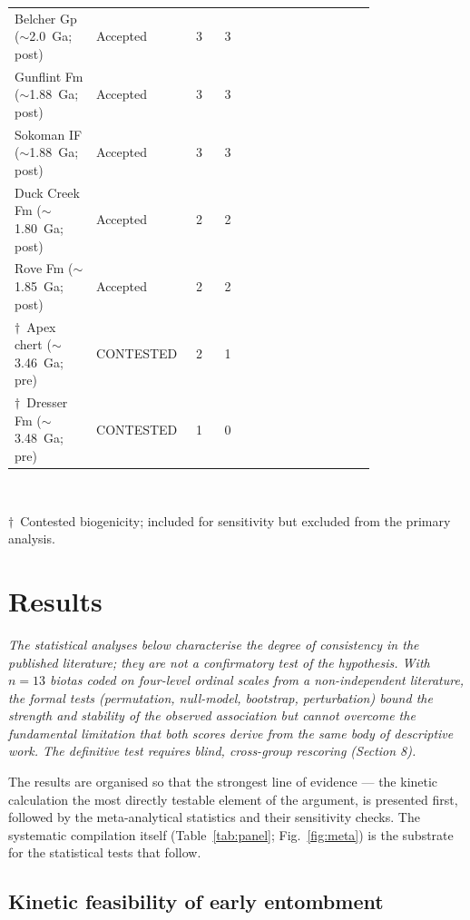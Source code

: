 \documentclass[11pt]{article}
\begin{document}
\begin{table}[t]
\begin{tabular}{p{0.205\linewidth}p{0.135\linewidth}p{0.075\linewidth}p{0.075\linewidth}p{0.30\linewidth}}
\midrule
Belcher Gp ($\sim$2.0~Ga; post) & Accepted & 3 & 3 & \citep{Javaux2018} \\
Gunflint Fm ($\sim$1.88~Ga; post) & Accepted & 3 & 3 & \citep{Lepot2017a,Wacey2013,Alleon2016a} \\
Sokoman IF ($\sim$1.88~Ga; post) & Accepted & 3 & 3 & \citep{Javaux2018} \\
Duck Creek Fm ($\sim$1.80~Ga; post) & Accepted & 2 & 2 & \citep{Javaux2018,Wacey2014} \\
Rove Fm ($\sim$1.85~Ga; post) & Accepted & 2 & 2 & \citep{Javaux2018,Wacey2014} \\
\midrule
$\dagger$~Apex chert ($\sim$3.46~Ga; pre) & CONTESTED & 2 & 1 & \citep{Schopf1993,Brasier2002,Wacey2014} \\
$\dagger$~Dresser Fm ($\sim$3.48~Ga; pre) & CONTESTED & 1 & 0 & \citep{Wacey2014} \\
\bottomrule
\end{tabular}
\\[2pt]
\raggedright\scriptsize $\dagger$~Contested biogenicity; included for sensitivity but excluded from
the primary analysis.
\end{table}

\section{Results}

\noindent\textit{The statistical analyses below characterise the degree of consistency in the
published literature; they are not a confirmatory test of the hypothesis. With $n=13$ biotas
coded on four-level ordinal scales from a non-independent literature, the formal tests
(permutation, null-model, bootstrap, perturbation) bound the strength and stability of the
observed association but cannot overcome the fundamental limitation that both scores derive
from the same body of descriptive work. The definitive test requires blind, cross-group
rescoring (Section 8).}


The results are organised so that the strongest line of evidence --- the kinetic calculation
the most directly testable element of the argument, is presented first,
followed by the meta-analytical statistics and their sensitivity checks. The systematic compilation
itself (Table~\ref{tab:panel}; Fig.~\ref{fig:meta}) is the substrate for the statistical tests that
follow.

\subsection{Kinetic feasibility of early entombment}
\end{document}
